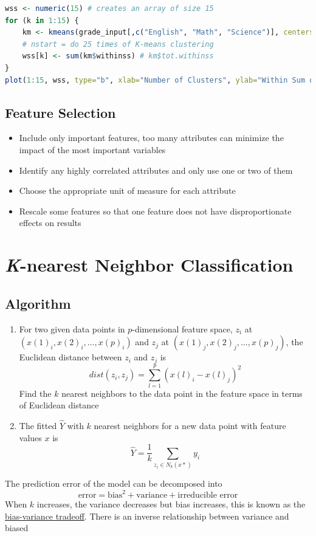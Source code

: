 \documentclass{article}
\begin{document}
\begin{lstlisting}[language=R]
wss <- numeric(15) # creates an array of size 15
for (k in 1:15) {
	km <- kmeans(grade_input[,c("English", "Math", "Science")], centers = k, nstart=25)
	# nstart = do 25 times of K-means clustering
	wss[k] <- sum(km$withinss) # km$tot.withinss
}
plot(1:15, wss, type="b", xlab="Number of Clusters", ylab="Within Sum of Squares")
\end{lstlisting}

\subsection{Feature Selection}
\begin{itemize}
    \item Include only important features, too many attributes can minimize the impact of the most important variables
    \item Identify any highly correlated attributes and only use one or two of them
    \item Choose the appropriate unit of measure for each attribute
    \item Rescale some features so that one feature does not have disproportionate effects on results
\end{itemize}

\section{\textit{K}-nearest Neighbor Classification}
\subsection{Algorithm}
\begin{enumerate}
    \item For two given data points in $p$-dimensional feature space, $z_i$ at $(x(1)_i, x(2)_i, \dots, x(p)_i)$ and $z_j$ at $(x(1)_j, x(2)_j, \dots, x(p)_j)$, the Euclidean distance between $z_i$ and $z_j$ is 
    $$dist(z_i, z_j) = \sum_{l=1}^{p} (x(l)_i - x(l)_j)^2$$
    Find the $k$ nearest neighbors to the data point in the feature space in terms of Euclidean distance
    \item The fitted $\hat{Y}$ with $k$ nearest neighbors for a new data point with feature values $x$ is
$$\hat{Y} = \frac{1}{k} \sum_{z_i \in N_k(x*)}y_i$$
\end{enumerate}
The prediction error of the model can be decomposed into 
$$\text{error} = \text{bias}^2 + \text{variance} + \text{irreducible error}$$
When $k$ increases, the variance decreases but bias increases, this is known as the \underline{bias-variance tradeoff}. There is an inverse relationship between variance and biased
\end{document}
